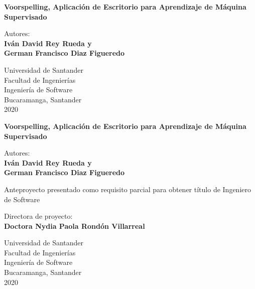 
\begin{titlepage}
    \begin{center}
        \textbf{Voorspelling, Aplicación de Escritorio para Aprendizaje de Máquina Supervisado}
        \vfill
        
        Autores:\\
        \textbf{
        Iván David Rey Rueda y\\
        German Francisco Diaz Figueredo}
        
        \vfill
        
        Universidad de Santander\\
        Facultad de Ingenierías\\
        Ingeniería de Software\\
        Bucaramanga, Santander\\
        2020
    \end{center}
\thispagestyle{otherplain}   
\pagebreak
    
\begin{center}
        \textbf{Voorspelling, Aplicación de Escritorio para Aprendizaje de Máquina Supervisado}
        
        \vfill
        
        Autores:\\
        \textbf{
        Iván David Rey Rueda y\\
        German Francisco Diaz Figueredo}
        
        \vfill
        Anteproyecto presentado como requisito parcial para obtener título de Ingeniero de Software
        
        \vfill
        
        Directora de proyecto:\\
        \textbf{Doctora Nydia Paola Rondón Villarreal}
        
        \vfill
        
        Universidad de Santander\\
        Facultad de Ingenierías\\
        Ingeniería de Software\\
        Bucaramanga, Santander\\
        2020
        
    \end{center}
\thispagestyle{otherplain}   
\end{titlepage}